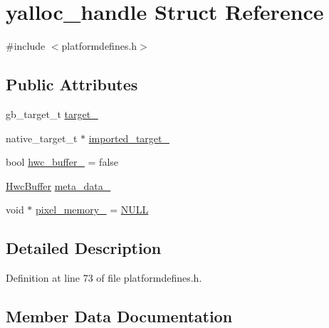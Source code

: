 \hypertarget{structyalloc__handle}{}\section{yalloc\+\_\+handle Struct Reference}
\label{structyalloc__handle}


{\ttfamily \#include $<$platformdefines.\+h$>$}

\subsection*{Public Attributes}
\begin{DoxyCompactItemize}
\item 
gb\+\_\+target\+\_\+t \mbox{\hyperlink{structyalloc__handle_a36250e79fcdc6f1e58020a9d2b891a48}{target\+\_\+}}
\item 
native\+\_\+target\+\_\+t $\ast$ \mbox{\hyperlink{structyalloc__handle_a3f3364ba0854ad9263dd49bb7f121053}{imported\+\_\+target\+\_\+}}
\item 
bool \mbox{\hyperlink{structyalloc__handle_ad1b5a7934204f6636871eb6270329654}{hwc\+\_\+buffer\+\_\+}} = false
\item 
\mbox{\hyperlink{structHwcBuffer}{Hwc\+Buffer}} \mbox{\hyperlink{structyalloc__handle_a2dfa4e2505a052e5ddbbe66e32b33875}{meta\+\_\+data\+\_\+}}
\item 
void $\ast$ \mbox{\hyperlink{structyalloc__handle_acd0886fed443ff0a5c5b3f5e471d0461}{pixel\+\_\+memory\+\_\+}} = \mbox{\hyperlink{alios_2platformdefines_8h_a070d2ce7b6bb7e5c05602aa8c308d0c4}{N\+U\+LL}}
\end{DoxyCompactItemize}


\subsection{Detailed Description}


Definition at line 73 of file platformdefines.\+h.



\subsection{Member Data Documentation}
\mbox{\label{structyalloc__handle_ad1b5a7934204f6636871eb6270329654}} 
